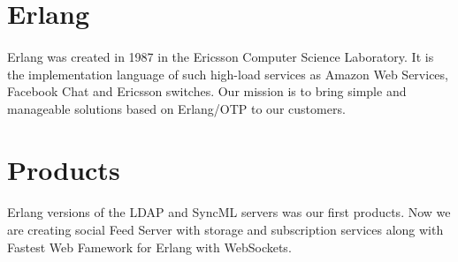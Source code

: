 \documentclass[11pt]{article}
\begin{document}
\paragraph{}
\paragraph{}
\paragraph{}

\section*{Erlang}
\paragraph{}
Erlang was created in 1987 in the Ericsson Computer Science Laboratory.
It is the implementation language of such high-load services as Amazon Web Services,
Facebook Chat and Ericsson switches.
Our mission is to bring simple and manageable solutions based on Erlang/OTP to our customers.

\section*{Products}
\paragraph{}
Erlang versions of the LDAP and SyncML servers was our first products. Now we are
creating social Feed Server with storage and subscription services along with
Fastest Web Famework for Erlang with WebSockets.
\end{document}
